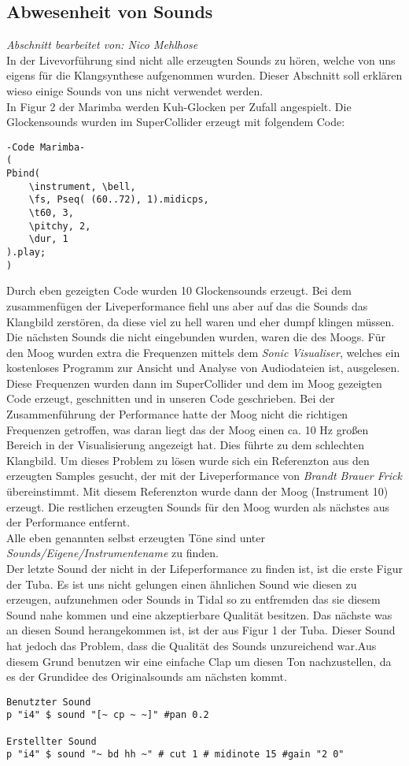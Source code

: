 \documentclass[
10pt, %
a4paper, %
oneside, %
headinclude,footinclude, %
BCOR5mm, %
]{scrartcl}
\begin{document}
\subsection{Abwesenheit von Sounds}
\textit{Abschnitt bearbeitet von: Nico Mehlhose}\\

\noindent In der Livevorführung sind nicht alle erzeugten Sounds zu hören, welche von uns eigens für die Klangsynthese aufgenommen wurden. Dieser Abschnitt soll erklären wieso einige Sounds von uns nicht verwendet werden.\\
In Figur 2 der Marimba werden Kuh-Glocken per Zufall angespielt. Die Glockensounds wurden im SuperCollider erzeugt mit folgendem Code:
\begin{lstlisting}
-Code Marimba-
(
Pbind(
	\instrument, \bell,
	\fs, Pseq( (60..72), 1).midicps,
	\t60, 3,
	\pitchy, 2,
	\dur, 1
).play;
)
\end{lstlisting}
Durch eben gezeigten Code wurden 10 Glockensounds erzeugt. Bei dem zusammenfügen der Liveperformance fiehl uns aber auf das die Sounds das Klangbild zerstören, da diese viel zu hell waren und eher dumpf klingen müssen.\\
Die nächsten Sounds die nicht eingebunden wurden, waren die des Moogs. Für den Moog wurden extra die Frequenzen mittels dem \textit{Sonic Visualiser}, welches ein kostenloses Programm zur Ansicht und Analyse von Audiodateien ist, ausgelesen.\cite{Sonic} Diese Frequenzen wurden dann im SuperCollider und dem im Moog gezeigten Code erzeugt, geschnitten und in unseren Code geschrieben. Bei der Zusammenführung der Performance hatte der Moog nicht die richtigen Frequenzen getroffen, was daran liegt das der Moog einen ca. 10 Hz großen Bereich in der Visualisierung angezeigt hat. Dies führte zu dem schlechten Klangbild. Um dieses Problem zu lösen wurde sich ein Referenzton aus den erzeugten Samples gesucht, der mit der Liveperformance von \textit{Brandt Brauer Frick} übereinstimmt. Mit diesem Referenzton wurde dann der Moog (Instrument 10) erzeugt. Die restlichen erzeugten Sounds für den Moog wurden als nächstes aus der Performance entfernt.\\
Alle eben genannten selbst erzeugten Töne sind unter \textit{Sounds/Eigene/Instrumentename} zu finden.\\
Der letzte Sound der nicht in der Lifeperformance zu finden ist, ist die erste Figur der Tuba. Es ist uns nicht gelungen einen ähnlichen Sound wie diesen zu erzeugen, aufzunehmen oder Sounds in Tidal so zu entfremden das sie diesem Sound nahe kommen und eine akzeptierbare Qualität besitzen. Das nächste was an diesen Sound herangekommen ist, ist der aus Figur 1 der Tuba. Dieser Sound hat jedoch das Problem, dass die Qualität des Sounds unzureichend war.Aus diesem Grund benutzen wir eine einfache Clap um diesen Ton nachzustellen, da es der Grundidee des Originalsounds am nächsten kommt.
\begin{lstlisting}
Benutzter Sound
p "i4" $ sound "[~ cp ~ ~]" #pan 0.2

Erstellter Sound
p "i4" $ sound "~ bd hh ~" # cut 1 # midinote 15 #gain "2 0"

\end{lstlisting}
\end{document}

